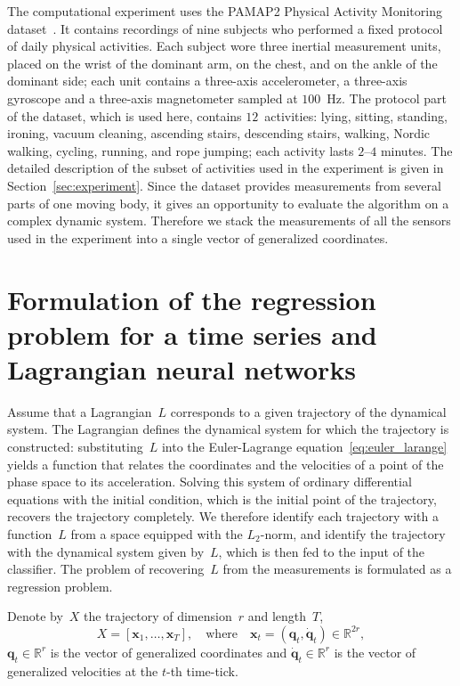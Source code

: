 \documentclass[sn-mathphys-num]{sn-jnl}
\theoremstyle{thmstylethree}
\theoremstyle{thmstyletwo}
\theoremstyle{thmstyleone}
\begin{document}
The computational experiment uses the PAMAP2 Physical Activity Monitoring dataset~\cite{misc_pamap2_physical_activity_monitoring_231}. It contains recordings of nine subjects who performed a fixed protocol of daily physical activities. Each subject wore three inertial measurement units, placed on the wrist of the dominant arm, on the chest, and on the ankle of the dominant side; each unit contains a three-axis accelerometer, a three-axis gyroscope and a three-axis magnetometer sampled at $100$~Hz. The protocol part of the dataset, which is used here, contains $12$~activities: lying, sitting, standing, ironing, vacuum cleaning, ascending stairs, descending stairs, walking, Nordic walking, cycling, running, and rope jumping; each activity lasts $2$--$4$ minutes. The detailed description of the subset of activities used in the experiment is given in Section~\ref{sec:experiment}. Since the dataset provides measurements from several parts of one moving body, it gives an opportunity to evaluate the algorithm on a complex dynamic system. Therefore we stack the measurements of all the sensors used in the experiment into a single vector of generalized coordinates.

\section{Formulation of the regression problem for a time series and
Lagrangian neural networks}

Assume that a Lagrangian~$L$ corresponds to a given trajectory of the dynamical system. The Lagrangian defines the dynamical system for which the trajectory is constructed: substituting~$L$ into the
Euler-Lagrange equation~\eqref{eq:euler_larange} yields a function that relates the coordinates and the velocities of a point of the phase space to its acceleration. Solving this system of ordinary differential equations with the initial condition, which is the initial point of the trajectory, recovers the trajectory completely. We therefore identify each trajectory with a function~$L$ from a space equipped with the $L_2$-norm, and identify the trajectory with the dynamical system given by~$L$, which is then fed to the input of the classifier. The problem of recovering~$L$ from the measurements is formulated as a regression problem.

Denote by~$X$ the trajectory of dimension~$r$ and length~$T$,
\begin{equation}
X = [\mathbf{x}_1,\dots, \mathbf{x}_T], \quad \text{where} \quad \mathbf{x}_t = (\mathbf{q}_t, \dot{\mathbf{q}}_t) \in \mathbb{R}^{2r},
\label{definition:trajectory}
\end{equation}
$\mathbf{q}_t \in \mathbb{R}^r$ is the vector of generalized coordinates and $\dot{\mathbf{q}}_t \in \mathbb{R}^r$ is the vector of generalized velocities at the $t$-th time-tick.
\end{document}
